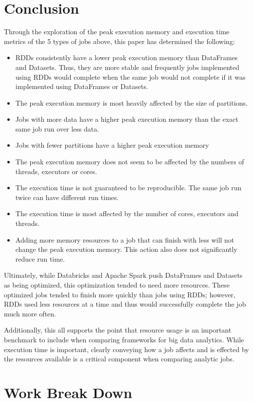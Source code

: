 \documentclass[conference]{IEEEtran}
\begin{document}
\section{Conclusion}
Through the exploration of the peak execution memory and execution time metrics of the 5 types of jobs above, this paper has determined the following:
\begin{itemize}
    \item RDDs consistently have a lower peak execution memory than DataFrames and Datasets.  Thus, they are more stable and frequently jobs implemented using RDDs would complete when the same job would not complete if it was implemented using DataFrames or Datasets.
    \item The peak execution memory is most heavily affected by the size of partitions.
    \item Jobs with more data have a higher peak execution memory than the exact same job run over less data.
    \item Jobs with fewer partitions have a higher peak execution memory
    \item The peak execution memory does not seem to be affected by the numbers of threads, executors or cores.
    \item The execution time is not guaranteed to be reproducible.  The same job run twice can have different run times.
    \item The execution time is most affected by the number of cores, executors and threads.
    \item Adding more memory resources to a job that can finish with less will not change the peak execution memory.  This action also does not significantly reduce run time.
\end{itemize}
Ultimately, while Databricks \cite{b1} and Apache Spark \cite{b9} push DataFrames and Datasets as being optimized, this optimization tended to need more resources.
These optimized jobs tended to finish more quickly than jobs using RDDs; however, RDDs used less resources at a time and thus would successfully complete the job much more often.

Additionally, this all supports the point that resource usage is an important benchmark to include when comparing frameworks for big data analytics.
While execution time is important, clearly conveying how a job affects and is effected by the resources available is a critical component when comparing analytic jobs.

\section{Work Break Down}
\end{document}
